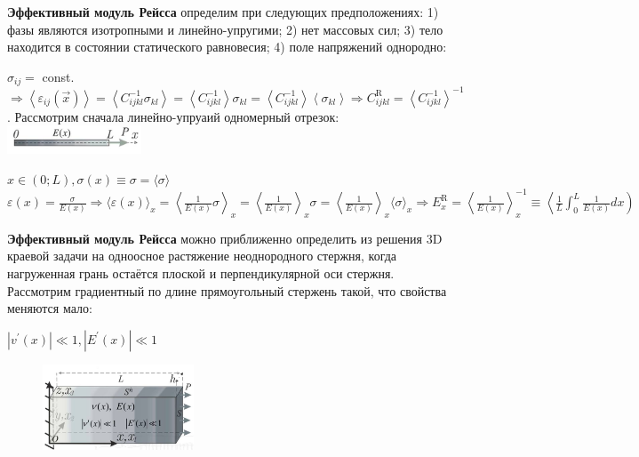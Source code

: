 \textbf{Эффективный модуль Рейсса} определим при следующих предположениях: 1) фазы являются изотропными и линейно-упругими; 2) нет массовых сил; 3) тело находится в состоянии статического равновесия; 4) поле напряжений однородно: 

$\sigma_{i j}=$ const. $\Rightarrow\left\langle\varepsilon_{i j}(\vec{x})\right\rangle=\left\langle C_{i j k l}^{-1} \sigma_{k l}\right\rangle=\left\langle C_{i j k l}^{-1}\right\rangle \sigma_{k l}=\left\langle C_{i j k l}^{-1}\right\rangle\left\langle\sigma_{k l}\right\rangle \Rightarrow C_{i j k l}^{\mathrm{R}}=\left\langle C_{i j k l}^{-1}\right\rangle^{-1}$. 
Рассмотрим сначала линейно-упруаий одномерный отрезок: 
\includegraphics[width=0.3\textwidth]{images/20.1.jpg}

$x \in(0 ; L), \sigma(x) \equiv \sigma=\langle\sigma\rangle$ 
$\displaystyle
\varepsilon(x)=\frac{\sigma}{E(x)} \Rightarrow\langle\varepsilon(x)\rangle_x=\left\langle\frac{1}{E(x)} \sigma\right\rangle_x=\left\langle\frac{1}{E(x)}\right\rangle_x \sigma=\left\langle\frac{1}{E(x)}\right\rangle_x\langle\sigma\rangle_x \Rightarrow E_x^{\mathrm{R}}=\left\langle\frac{1}{E(x)}\right\rangle_x^{-1} \equiv\left\langle\frac{1}{L} \int_0^L \frac{1}{E(x)} d x\right)
$

\vspace{0.5cm}

\textbf{Эффективный модуль Рейсса} можно приближенно определить из решения 3D краевой задачи на одноосное растяжение неоднородного стержня, когда нагруженная грань остаётся плоской и перпендикулярной оси стержня. Рассмотрим градиентный по длине прямоугольный стержень такой, что свойства меняются мало: 

$\left|v^{\prime}(x)\right| \ll 1, \left|E^{\prime}(x)\right| \ll 1$ 

\begin{figure}[h!]
  \centering
  \includegraphics[width=0.4\textwidth]{images/20.2.jpg}
\end{figure}



